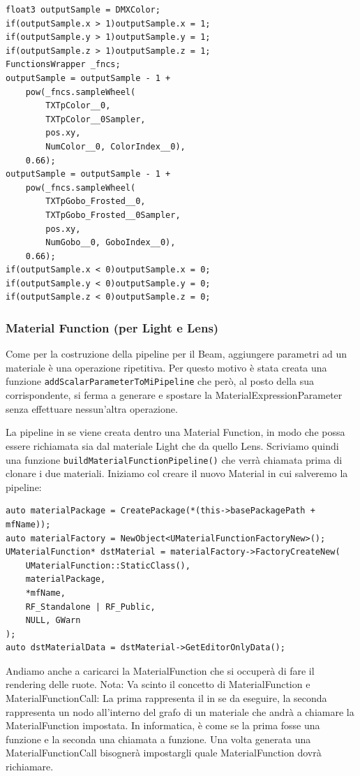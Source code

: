 \documentclass[main.tex]{subfiles}
\begin{document}
\lstset{language=glsl}
\begin{lstlisting}
float3 outputSample = DMXColor;
if(outputSample.x > 1)outputSample.x = 1;
if(outputSample.y > 1)outputSample.y = 1;
if(outputSample.z > 1)outputSample.z = 1;
FunctionsWrapper _fncs;
outputSample = outputSample - 1 +
    pow(_fncs.sampleWheel(
        TXTpColor__0,
        TXTpColor__0Sampler,
        pos.xy,
        NumColor__0, ColorIndex__0),
    0.66);
outputSample = outputSample - 1 +
    pow(_fncs.sampleWheel(
        TXTpGobo_Frosted__0,
        TXTpGobo_Frosted__0Sampler,
        pos.xy,
        NumGobo__0, GoboIndex__0),
    0.66);
if(outputSample.x < 0)outputSample.x = 0;
if(outputSample.y < 0)outputSample.y = 0;
if(outputSample.z < 0)outputSample.z = 0;
\end{lstlisting}
\clearpage %

\subsubsection{Material Function (per Light e Lens)}\label{subsec:2_3_MF}
Come per la costruzione della pipeline per il Beam, aggiungere parametri ad un materiale è una operazione ripetitiva. Per questo motivo è stata creata una funzione \lstinline{addScalarParameterToMiPipeline} che però, al posto della sua corrispondente, si ferma a generare e spostare la MaterialExpressionParameter senza effettuare nessun'altra operazione. \newline

La pipeline in se viene creata dentro una Material Function, in modo che possa essere richiamata sia dal materiale Light che da quello Lens. Scriviamo quindi una funzione \lstinline{buildMaterialFunctionPipeline()} che verrà chiamata prima di clonare i due materiali. Iniziamo col creare il nuovo Material in cui salveremo la pipeline:
\lstset{language=UEcpp}
\begin{lstlisting}
auto materialPackage = CreatePackage(*(this->basePackagePath + mfName));
auto materialFactory = NewObject<UMaterialFunctionFactoryNew>();
UMaterialFunction* dstMaterial = materialFactory->FactoryCreateNew(
    UMaterialFunction::StaticClass(),
    materialPackage,
    *mfName,
    RF_Standalone | RF_Public,
    NULL, GWarn
);
auto dstMaterialData = dstMaterial->GetEditorOnlyData();
\end{lstlisting}
Andiamo anche a caricarci la MaterialFunction che si occuperà di fare il rendering delle ruote. Nota: Va scinto il concetto di MaterialFunction e MaterialFunctionCall: La prima rappresenta il  in se da eseguire, la seconda rappresenta un nodo all'interno del grafo di un materiale che andrà a chiamare la MaterialFunction impostata. In informatica, è come se la prima fosse una funzione e la seconda una chiamata a funzione. Una volta generata una MaterialFunctionCall bisognerà impostargli quale MaterialFunction dovrà richiamare.
\end{document}
